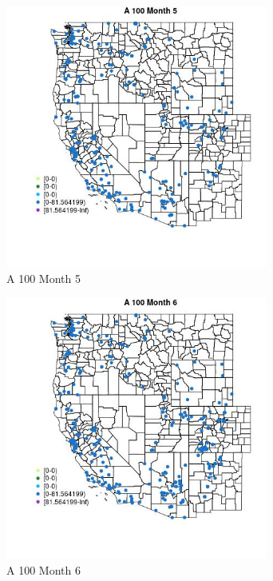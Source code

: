 \begin{figure} 
\centering  
\includegraphics[width=0.77\textwidth]{Code_Outputs/Report_ML_input_PM25_Step4_part_e_de_duplicated_aveswNAs_MapObsMo5A_100.jpg} 
\caption{\label{fig:Report_ML_input_PM25_Step4_part_e_de_duplicated_aveswNAsMapObsMo5A_100}A 100 Month 5} 
\end{figure} 
 

\begin{figure} 
\centering  
\includegraphics[width=0.77\textwidth]{Code_Outputs/Report_ML_input_PM25_Step4_part_e_de_duplicated_aveswNAs_MapObsMo6A_100.jpg} 
\caption{\label{fig:Report_ML_input_PM25_Step4_part_e_de_duplicated_aveswNAsMapObsMo6A_100}A 100 Month 6} 
\end{figure} 
 


